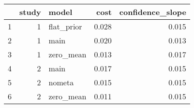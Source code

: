 \begin{table}[ht]
\centering
\begin{tabular}{rrlrr}
  \hline
 & study & model & cost & confidence\_slope \\ 
  \hline
1 &    1 & flat\_prior & 0.028 & 0.015 \\ 
  2 &    1 & main & 0.020 & 0.013 \\ 
  3 &    1 & zero\_mean & 0.013 & 0.017 \\ 
  4 &    2 & main & 0.017 & 0.015 \\ 
  5 &    2 & nometa & 0.015 & 0.015 \\ 
  6 &    2 & zero\_mean & 0.011 & 0.015 \\ 
   \hline
\end{tabular}
\end{table}
